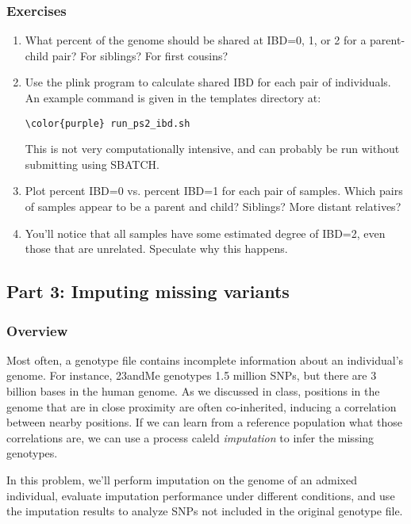 \documentclass[12pt]{article}
\begin{document}
\subsubsection*{Exercises}
\begin{enumerate}
\item What percent of the genome should be shared at IBD=0, 1, or 2 for a parent-child pair? For siblings? For first cousins?

\item Use the plink program to calculate shared IBD for each pair of individuals. An example command is given in the templates directory at:
\begin{Verbatim}[commandchars=\\\{\}]
\color{purple} run_ps2_ibd.sh
\end{Verbatim}
This is not very computationally intensive, and can probably be run without submitting using SBATCH.

\item Plot percent IBD=0 vs. percent IBD=1 for each pair of samples. Which pairs of samples appear to be a parent and child? Siblings? More distant relatives? 

\item You'll notice that all samples have some estimated degree of IBD=2, even those that are unrelated. Speculate why this happens.

\end{enumerate}

\subsection*{Part 3: Imputing missing variants}

\subsubsection*{Overview}

Most often, a genotype file contains incomplete information about an individual's genome. For instance, 23andMe genotypes 1.5 million SNPs, but there are 3 billion bases in the human genome. As we discussed in class, positions in the genome that are in close proximity are often co-inherited, inducing a correlation between nearby positions. If we can learn from a reference population what those correlations are, we can use a process caleld \emph{imputation} to infer the missing genotypes.

In this problem, we'll perform imputation on the genome of an admixed individual, evaluate imputation performance under different conditions, and use the imputation results to analyze SNPs not included in the original genotype file.
\end{document}
